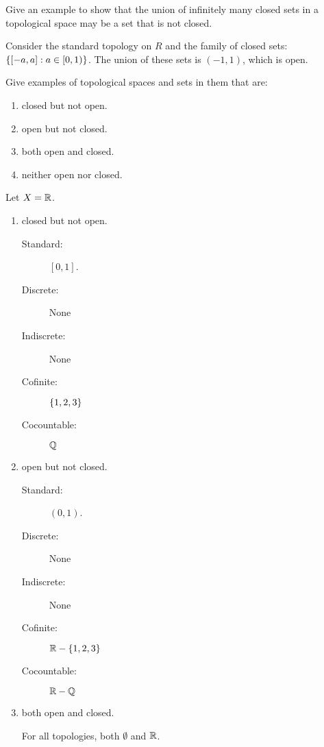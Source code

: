 \documentclass[letterpaper,12pt,fleqn]{article}
\begin{document}
\begin{example}
  Give an example to show that the union of infinitely many closed sets in a topological space may be a set that
  is not closed.

  Consider the standard topology on \(R\) and the family of closed sets: \(\{[-a,a]:a\in[0,1)\}\).  The union of
  these sets is \((-1,1)\), which is open.
\end{example}

\begin{example}
  Give examples of topological spaces and sets in them that are:
  \begin{enumerate}
  \item closed but not open.
  \item open but not closed.
  \item both open and closed.
  \item neither open nor closed.
  \end{enumerate}

  Let \(X=\mathbb{R}\).

  \begin{enumerate}
  \item closed but not open.

    \begin{description}
    \item[Standard:] \([0,1]\).
    \item[Discrete:] None
    \item[Indiscrete:] None
    \item[Cofinite:] \(\{1,2,3\}\)
    \item[Cocountable:] \(\mathbb{Q}\)
    \end{description}

  \item open but not closed.

    \begin{description}
    \item[Standard:] \((0,1)\).
    \item[Discrete:] None
    \item[Indiscrete:] None
    \item[Cofinite:] \(\mathbb{R}-\{1,2,3\}\)
    \item[Cocountable:] \(\mathbb{R}-\mathbb{Q}\)
    \end{description}

  \item both open and closed.

    For all topologies, both \(\emptyset\) and \(\mathbb{R}\).


\end{enumerate}
\end{example}
\end{document}
